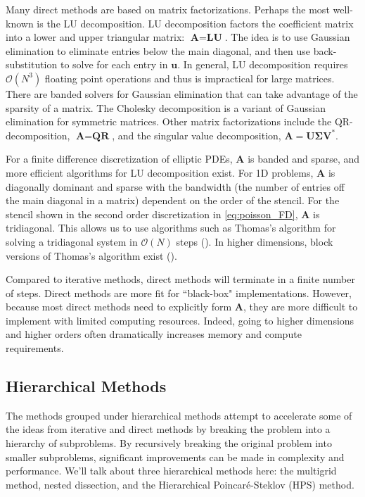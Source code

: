 Many direct methods are based on matrix factorizations. Perhaps the most well-known is the LU decomposition. LU decomposition factors the coefficient matrix into a lower and upper triangular matrix: $\textbf{A} = \textbf{L} \textbf{U}$. The idea is to use Gaussian elimination to eliminate entries below the main diagonal, and then use back-substitution to solve for each entry in $\textbf{u}$. In general, LU decomposition requires $\mathcal{O}(N^3)$ floating point operations and thus is impractical for large matrices. There are banded solvers for Gaussian elimination that can take advantage of the sparsity of a matrix. The Cholesky decomposition is a variant of Gaussian elimination for symmetric matrices. Other matrix factorizations include the QR-decomposition, $\textbf{A} = \textbf{Q} \textbf{R}$, and the singular value decomposition, $\textbf{A} = \textbf{U} \boldsymbol{\Sigma} \textbf{V}^*$.

For a finite difference discretization of elliptic PDEs, $\textbf{A}$ is banded and sparse, and more efficient algorithms for LU decomposition exist. For 1D problems, $\textbf{A}$ is diagonally dominant and sparse with the bandwidth (the number of entries off the main diagonal in a matrix) dependent on the order of the stencil. For the stencil shown in the second order discretization in \ref{eq:poisson_FD}, $\textbf{A}$ is tridiagonal. This allows us to use algorithms such as Thomas's algorithm for solving a tridiagonal system in $\mathcal{O}(N)$ steps (\citep{higham2002accuracy}). In higher dimensions, block versions of Thomas's algorithm exist (\citep{quarteroni2010numerical}).

Compared to iterative methods, direct methods will terminate in a finite number of steps. Direct methods are more fit for ``black-box" implementations. However, because most direct methods need to explicitly form $\textbf{A}$, they are more difficult to implement with limited computing resources. Indeed, going to higher dimensions and higher orders often dramatically increases memory and compute requirements.

\subsection{Hierarchical Methods}
\label{sub:hierarchical-methods}

The methods grouped under hierarchical methods attempt to accelerate some of the ideas from iterative and direct methods by breaking the problem into a hierarchy of subproblems. By recursively breaking the original problem into smaller subproblems, significant improvements can be made in complexity and performance. We'll talk about three hierarchical methods here: the multigrid method, nested dissection, and the Hierarchical Poincaré-Steklov (HPS) method.

